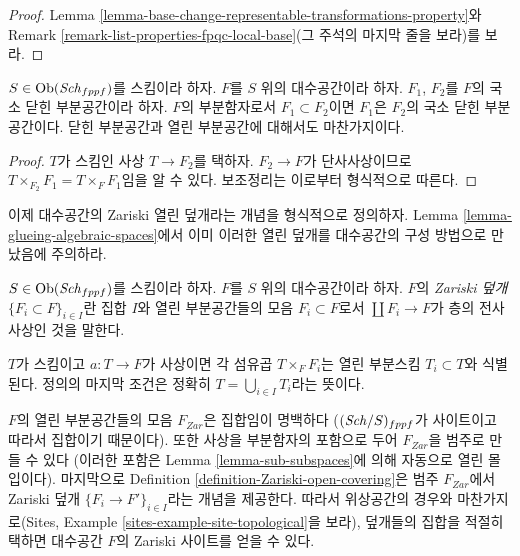 \begin{proof}
Lemma \ref{lemma-base-change-representable-transformations-property}와
Remark \ref{remark-list-properties-fpqc-local-base}(그 주석의 마지막
줄을 보라)를 보라.
\end{proof}

\begin{lemma}
\label{lemma-sub-subspaces}
$S \in \mathop{\mathrm{Ob}}\nolimits(\mathit{Sch}_{fppf})$를 스킴이라 하자.
$F$를 $S$ 위의 대수공간이라 하자. $F_1$, $F_2$를 $F$의 국소 닫힌
부분공간이라 하자. $F$의 부분함자로서 $F_1 \subset F_2$이면
$F_1$은 $F_2$의 국소 닫힌 부분공간이다.
닫힌 부분공간과 열린 부분공간에 대해서도 마찬가지이다.
\end{lemma}

\begin{proof}
$T$가 스킴인 사상 $T \to F_2$를 택하자.
$F_2 \to F$가 단사사상이므로
$T \times_{F_2} F_1 = T \times_F F_1$임을 알 수 있다.
보조정리는 이로부터 형식적으로 따른다.
\end{proof}

\noindent
이제 대수공간의 Zariski 열린 덮개라는 개념을 형식적으로 정의하자.
Lemma \ref{lemma-glueing-algebraic-spaces}에서 이미 이러한 열린 덮개를
대수공간의 구성 방법으로 만났음에 주의하라.

\begin{definition}
\label{definition-Zariski-open-covering}
$S \in \mathop{\mathrm{Ob}}\nolimits(\mathit{Sch}_{fppf})$를 스킴이라 하자.
$F$를 $S$ 위의 대수공간이라 하자.
$F$의 {\it Zariski 덮개} $\{F_i \subset F\}_{i \in I}$란 집합 $I$와
열린 부분공간들의 모음 $F_i \subset F$로서
$\coprod F_i \to F$가 층의 전사사상인 것을 말한다.
\end{definition}

\noindent
$T$가 스킴이고 $a : T \to F$가 사상이면 각 섬유곱
$T \times_F F_i$는 열린 부분스킴 $T_i \subset T$와 식별된다.
정의의 마지막 조건은 정확히 $T = \bigcup_{i \in I} T_i$라는 뜻이다.

\medskip\noindent
$F$의 열린 부분공간들의 모음 $F_{Zar}$은 집합임이 명백하다
($(\mathit{Sch}/S)_{fppf}$가 사이트이고 따라서 집합이기 때문이다).
또한 사상을 부분함자의 포함으로 두어 $F_{Zar}$을 범주로 만들 수 있다
(이러한 포함은 Lemma \ref{lemma-sub-subspaces}에 의해 자동으로 열린
몰입이다). 마지막으로 Definition \ref{definition-Zariski-open-covering}은
범주 $F_{Zar}$에서 Zariski 덮개 $\{F_i \to F'\}_{i \in I}$라는 개념을
제공한다. 따라서 위상공간의 경우와 마찬가지로(Sites, Example
\ref{sites-example-site-topological}을 보라), 덮개들의 집합을 적절히
택하면 대수공간 $F$의 Zariski 사이트를 얻을 수 있다.

